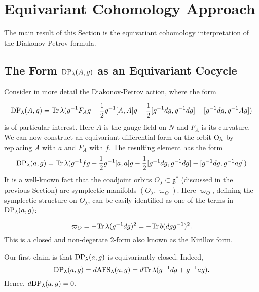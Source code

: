 \documentclass[11pt]{report}
\theoremstyle{plain}
\theoremstyle{definition}
\theoremstyle{remark}
\theoremstyle{remark}
\numberwithin{equation}{section}
\begin{document}
\section{Equivariant Cohomology Approach}
The main result of this Section is the equivariant cohomology interpretation of the Diakonov-Petrov formula.




\subsection{The Form ${\rm DP}_\lambda(A,g)$ as an Equivariant Cocycle}
Consider in more detail the Diakonov-Petrov action, where the form

%
\begin{equation}
{\rm DP}_\lambda(A,g)= {\rm Tr} \, \lambda (g^{-1} F_A g - \frac{1}{2} g^{-1}[A,A] g - \frac{1}{2} [g^{-1} dg , g^{-1} dg] - [g^{-1} dg , g^{-1} Ag])
\end{equation}
is of particular interest. Here $A$ is the gauge field on  $N$ and $F_A$ is its curvature.  We can now construct an equivariant differential form on the orbit ${\rm O}_\lambda$ by replacing $A$ with $a$ and $F_A$ with $f$. The resulting element has the form
%
\begin{equation}
{\rm DP}_\lambda(a,g) = {\rm Tr} \, \lambda (g^{-1} f g - \frac{1}{2} g^{-1}[a,a] g - \frac{1}{2} [g^{-1} dg , g^{-1} dg] - [g^{-1} dg , g^{-1} ag])
\end{equation}
 It is a well-known fact that the coadjoint orbits $O_\lambda \subset \mathfrak{g}^*$ (discussed in the previous Section) are symplectic manifolds $(O_\lambda, \varpi_O)$. Here $\varpi_O$, defining the symplectic structure on $O_\lambda$, can be easily identified as one of the terms in ${\rm DP}_\lambda(a,g)$: 

%
\begin{equation}
\varpi_O = - {\rm Tr} \, \lambda(g^{-1}dg)^2= - {\rm Tr} \, b(dg g^{-1})^2.
\end{equation}
This is a closed and non-degerate 2-form also known as the Kirillov form. 

Our first claim is that ${\rm DP}_\lambda(a,g)$ is equivariantly closed. Indeed,
%
$$
{\rm DP}_\lambda(a,g) = d {\rm AFS}_\lambda(a,g)=d {\rm Tr} \, \lambda(g^{-1} dg + g^{-1} a g).
$$
Hence,  $d {\rm DP}_\lambda(a,g)= 0$.
\end{document}
